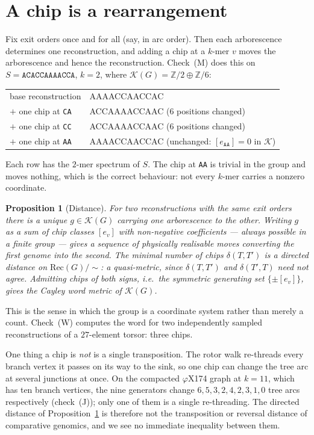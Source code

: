 \documentclass[11pt]{article}
\theoremstyle{plain}
\newtheorem{proposition}[theorem]{Proposition}
\theoremstyle{definition}
\theoremstyle{remark}
\newcommand{\Z}{\mathbb{Z}}
\newcommand{\K}{\mathcal{K}}
\newcommand{\Rec}{\mathrm{Rec}}
\begin{document}
\section{A chip is a rearrangement}\label{sec:moves}

Fix exit orders once and for all (say, in arc order). Then each arborescence determines
one reconstruction, and adding a chip at a $k$-mer $v$ moves the arborescence and hence
the reconstruction. Check~(M) does this on $S=\texttt{ACACCAAAACCA}$, $k=2$, where
$\K(G)=\Z/2\oplus\Z/6$:
\begin{center}\ttfamily\small
\begin{tabular}{ll}
base reconstruction & AAAACCAACCAC\\
$+$ one chip at \texttt{CA} & ACCAAAACCAAC \quad(6 positions changed)\\
$+$ one chip at \texttt{CC} & ACCAAAACCAAC \quad(6 positions changed)\\
$+$ one chip at \texttt{AA} & AAAACCAACCAC \quad(unchanged: $[e_{\texttt{AA}}]=0$ in $\K$)\\
\end{tabular}
\end{center}
Each row has the $2$-mer spectrum of $S$. The chip at \texttt{AA} is trivial in the group
and moves nothing, which is the correct behaviour: not every $k$-mer carries a nonzero
coordinate.

\begin{proposition}[Distance]\label{prop:distance}
For two reconstructions with the same exit orders there is a unique $g\in\K(G)$ carrying
one arborescence to the other. Writing $g$ as a sum of chip classes $[e_v]$ with
non-negative coefficients --- always possible in a finite group --- gives a sequence of
physically realisable moves converting the first genome into the second. The minimal
number of chips $\delta(T,T')$ is a \emph{directed} distance on $\Rec(G)/\!\sim$: a
quasi-metric, since $\delta(T,T')$ and $\delta(T',T)$ need not agree. Admitting chips of
both signs, i.e.\ the symmetric generating set $\{\pm[e_v]\}$, gives the Cayley word
metric of $\K(G)$.
\end{proposition}

This is the sense in which the group is a coordinate system rather than merely a count.
Check~(W) computes the word for two independently sampled reconstructions of a
$27$-element torsor: three chips.

One thing a chip is \emph{not} is a single transposition. The rotor walk re-threads every
branch vertex it passes on its way to the sink, so one chip can change the tree arc at
several junctions at once. On the compacted $\varphi$X174 graph at $k=11$, which has ten
branch vertices, the nine generators change $6,5,3,2,4,2,3,1,0$ tree arcs respectively
(check~(J)); only one of them is a single re-threading. The directed distance of
Proposition~\ref{prop:distance} is therefore not the transposition or reversal distance
of comparative genomics, and we see no immediate inequality between them.
\end{document}
